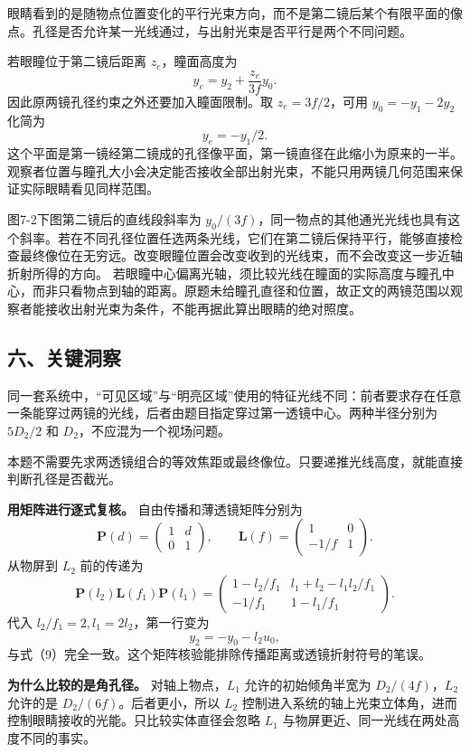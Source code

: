 \documentclass[12pt,a4paper,UTF8]{ctexart}
\begin{document}
眼睛看到的是随物点位置变化的平行光束方向，而不是第二镜后某个有限平面的像点。孔径是否允许某一光线通过，与出射光束是否平行是两个不同问题。

若眼瞳位于第二镜后距离 \(z_e\)，瞳面高度为 \[
y_e=y_2+\frac{z_e}{3f}y_0.
\] 因此原两镜孔径约束之外还要加入瞳面限制。取 \(z_e=3f/2\)，可用
\(y_0=-y_1-2y_2\) 化简为 \[
y_e=-y_1/2.
\]
这个平面是第一镜经第二镜成的孔径像平面，第一镜直径在此缩小为原来的一半。观察者位置与瞳孔大小会决定能否接收全部出射光束，不能只用两镜几何范围来保证实际眼睛看见同样范围。

图7-2下图第二镜后的直线段斜率为
\(y_0/(3f)\)，同一物点的其他通光光线也具有这个斜率。若在不同孔径位置任选两条光线，它们在第二镜后保持平行，能够直接检查最终像位在无穷远。改变眼瞳位置会改变收到的光线束，而不会改变这一步近轴折射所得的方向。
若眼瞳中心偏离光轴，须比较光线在瞳面的实际高度与瞳孔中心，而非只看物点到轴的距离。原题未给瞳孔直径和位置，故正文的两镜范围以观察者能接收出射光束为条件，不能再据此算出眼睛的绝对照度。

\subsection{六、关键洞察}\label{ux516dux5173ux952eux6d1eux5bdf-6}

同一套系统中，``可见区域''与``明亮区域''使用的特征光线不同：前者要求存在任意一条能穿过两镜的光线，后者由题目指定穿过第一透镜中心。两种半径分别为
\(5D_2/2\) 和 \(D_2\)，不应混为一个视场问题。

本题不需要先求两透镜组合的等效焦距或最终像位。只要递推光线高度，就能直接判断孔径是否截光。

\textbf{用矩阵进行逐式复核。} 自由传播和薄透镜矩阵分别为 \[
\bm P(d)=\begin{pmatrix}1&d\\0&1\end{pmatrix},
\qquad
\bm L(f)=\begin{pmatrix}1&0\\-1/f&1\end{pmatrix}.
\] 从物屏到 \(L_2\) 前的传递为 \[
\bm P(l_2)\bm L(f_1)\bm P(l_1)
=\begin{pmatrix}
1-l_2/f_1&
l_1+l_2-l_1l_2/f_1\\
-1/f_1&1-l_1/f_1
\end{pmatrix}.
\] 代入 \(l_2/f_1=2,l_1=2l_2\)，第一行变为 \[
y_2=-y_0-l_2u_0,
\] 与式（9）完全一致。这个矩阵核验能排除传播距离或透镜折射符号的笔误。

\textbf{为什么比较的是角孔径。} 对轴上物点，\(L_1\) 允许的初始倾角半宽为
\(D_2/(4f)\)，\(L_2\) 允许的是 \(D_2/(6f)\)。后者更小，所以 \(L_2\)
控制进入系统的轴上光束立体角，进而控制眼睛接收的光能。只比较实体直径会忽略
\(L_1\) 与物屏更近、同一光线在两处高度不同的事实。
\end{document}
